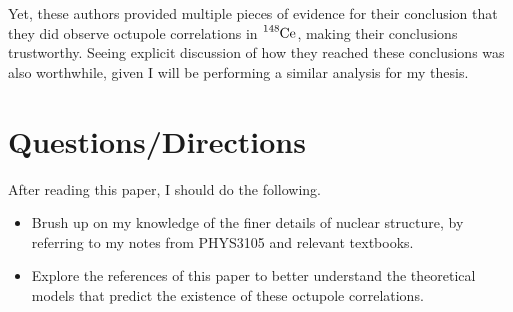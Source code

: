 \documentclass[12pt,a4paper]{article}
\begin{document}
\medskip
Yet, these authors provided multiple pieces of evidence for their conclusion that they did observe octupole correlations in $\ce{^{148}Ce}$, making their conclusions trustworthy. Seeing explicit discussion of how they reached these conclusions was also worthwhile, given I will be performing a similar analysis for my thesis.

\section*{Questions/Directions}
After reading this paper, I should do the following.
\begin{itemize}
\item Brush up on my knowledge of the finer details of nuclear structure, by referring to my notes from PHYS3105 and relevant textbooks.
\item Explore the references of this paper to better understand the theoretical models that predict the existence of these octupole correlations.
\end{itemize}

%

\end{document}

